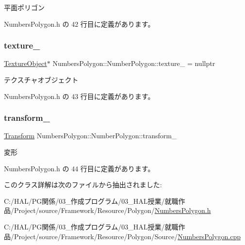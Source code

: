 平面ポリゴン 



 Numbers\+Polygon.\+h の 42 行目に定義があります。

\mbox{\label{class_numbers_polygon_1_1_number_polygon_aa276e12a69aab753c8c35a7f41f5452f}} 
\subsubsection{\texorpdfstring{texture\+\_\+}{texture\_}}
{\footnotesize\ttfamily \mbox{\hyperlink{class_texture_object}{Texture\+Object}}$\ast$ Numbers\+Polygon\+::\+Number\+Polygon\+::texture\+\_\+ = nullptr\hspace{0.3cm}{\ttfamily [private]}}



テクスチャオブジェクト 



 Numbers\+Polygon.\+h の 43 行目に定義があります。

\mbox{\label{class_numbers_polygon_1_1_number_polygon_a199d698d4986e1fb9cfbfbac6a383fc2}} 
\subsubsection{\texorpdfstring{transform\+\_\+}{transform\_}}
{\footnotesize\ttfamily \mbox{\hyperlink{class_transform}{Transform}} Numbers\+Polygon\+::\+Number\+Polygon\+::transform\+\_\+\hspace{0.3cm}{\ttfamily [private]}}



変形 



 Numbers\+Polygon.\+h の 44 行目に定義があります。



このクラス詳解は次のファイルから抽出されました\+:\begin{DoxyCompactItemize}
\item 
C\+:/\+H\+A\+L/\+P\+G関係/03\+\_\+作成プログラム/03\+\_\+\+H\+A\+L授業/就職作品/\+Project/source/\+Framework/\+Resource/\+Polygon/\mbox{\hyperlink{_numbers_polygon_8h}{Numbers\+Polygon.\+h}}\item 
C\+:/\+H\+A\+L/\+P\+G関係/03\+\_\+作成プログラム/03\+\_\+\+H\+A\+L授業/就職作品/\+Project/source/\+Framework/\+Resource/\+Polygon/\+Source/\mbox{\hyperlink{_numbers_polygon_8cpp}{Numbers\+Polygon.\+cpp}}\end{DoxyCompactItemize}
